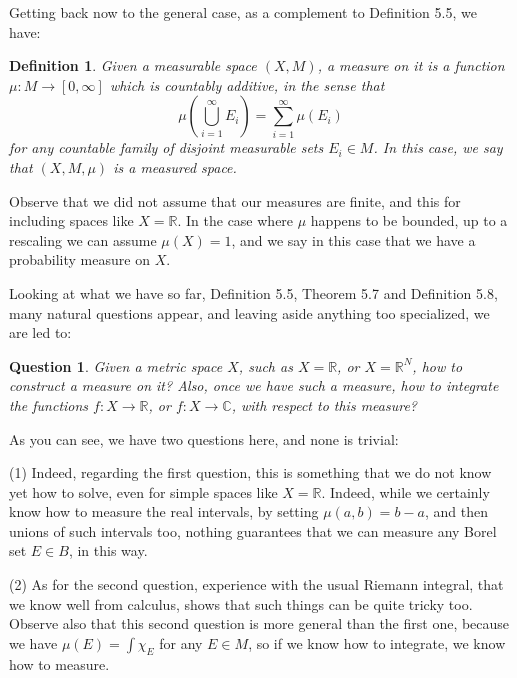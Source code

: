 \documentclass[12pt]{amsbook}
\newtheorem{definition}[theorem]{Definition}
\newtheorem{question}[theorem]{Question}
\begin{document}
\bigskip

Getting back now to the general case, as a complement to Definition 5.5, we have:

\begin{definition}
Given a measurable space $(X,M)$, a measure on it is a function $\mu:M\to[0,\infty]$ which is countably additive, in the sense that
$$\mu\left(\bigcup_{i=1}^\infty E_i\right)=\sum_{i=1}^\infty\mu(E_i)$$
for any countable family of disjoint measurable sets $E_i\in M$. In this case, we say that $(X,M,\mu)$ is a measured space.
\end{definition}

Observe that we did not assume that our measures are finite, and this for including spaces like $X=\mathbb R$. In the case where $\mu$ happens to be bounded, up to a rescaling we can assume $\mu(X)=1$, and we say in this case that we have a probability measure on $X$.

\bigskip

Looking at what we have so far, Definition 5.5, Theorem 5.7 and Definition 5.8, many natural questions appear, and leaving aside anything too specialized, we are led to:

\begin{question}
Given a metric space $X$, such as $X=\mathbb R$, or $X=\mathbb R^N$, how to construct a measure on it? Also, once we have such a measure, how to integrate the functions $f:X\to\mathbb R$, or $f:X\to\mathbb C$, with respect to this measure?
\end{question}

As you can see, we have two questions here, and none is trivial:

\medskip

(1) Indeed, regarding the first question, this is something that we do not know yet how to solve, even for simple spaces like $X=\mathbb R$. Indeed, while we certainly know how to measure the real intervals, by setting $\mu(a,b)=b-a$, and then unions of such intervals too, nothing guarantees that we can measure any Borel set $E\in B$, in this way. 

\medskip

(2) As for the second question, experience with the usual Riemann integral, that we know well from calculus, shows that such things can be quite tricky too. Observe also that this second question is more general than the first one, because we have $\mu(E)=\int\chi_E$ for any $E\in M$, so if we know how to integrate, we know how to measure. 
\end{document}
